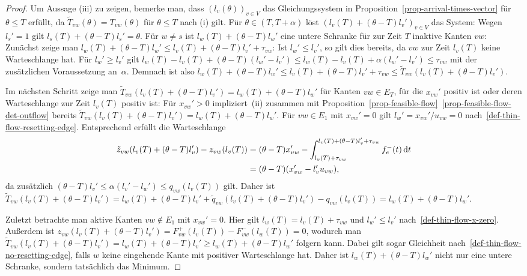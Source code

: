 \begin{proof}
	Um Aussage (iii) zu zeigen, bemerke man, dass $(l_v(\theta))_{v\in V}$ das Gleichungssystem in Proposition~\ref{prop-arrival-times-vector} für $\theta \leq T$ erfüllt, da $\tilde{T}_{vw}(\theta) = T_{vw}(\theta)$ für $\theta\leq T$ nach (i) gilt.
	Für $\theta \in (T, T+\alpha)$ löst $(l_v(T) + (\theta - T)l_v')_{v\in V}$  das System:
	Wegen $l_s' = 1$ gilt $l_s(T) + (\theta - T)l_s' = \theta$.
	Für $w\neq s$ ist $l_w(T) + (\theta - T) l_w'$ eine untere Schranke für zur Zeit $T$ inaktive Kanten $vw$:
	Zunächst zeige man $l_w(T) + (\theta - T)l_w' \leq l_v(T) + (\theta - T)l_v' + \tau_{vw}$:
	Ist $l_w' \leq l_v'$, so gilt dies bereits, da $vw$ zur Zeit $l_v(T)$ keine Warteschlange hat.
	Für $l_w' \geq l_v'$ gilt $l_w(T) - l_v(T) + (\theta - T) (l_w' - l_v') \leq l_w(T) - l_v(T) + \alpha (l_w' - l_v') \leq \tau_{vw}$ mit der zusätzlichen Voraussetzung an~$\alpha$.
	Demnach ist also $l_w(T) + (\theta - T) l_w' \leq l_v(T) + (\theta - T) l_v' + \tau_{vw} \leq \tilde{T}_{vw}(l_v(T) + (\theta - T) l_v')$.
	
	Im nächsten Schritt zeige man $\tilde{T}_{vw}(l_v(T) + (\theta - T)l_v') = l_w(T) + (\theta - T) l_w'$ für Kanten $vw\in E_T$, für die $x_{vw}'$ positiv ist oder deren Warteschlange zur Zeit $l_v(T)$ positiv ist:
	Für $x_{vw}' > 0$ impliziert~(ii) zusammen mit Proposition~\ref{prop-feasible-flow}~\ref{prop-feasible-flow-det-outflow} bereits $\tilde{T}_{vw}(l_v(T) + (\theta-T)l_v') = l_w(T) + (\theta - T) l_w'$.
	Für $vw\in E_1$ mit $x_{vw}'=0$ gilt $l_w' = x_{vw}' / u_{vw} = 0$ nach~\ref{def-thin-flow-resetting-edge}.
	Entsprechend erfüllt die Warteschlange
	\begin{align*}
	\tilde{z}_{vw}(l_v(T) + (\theta - T)l_v') - z_{vw}(l_v(T)) &= (\theta - T) x_{vw}' - \int_{l_v(T) + \tau_{vw}}^{l_v(T) + (\theta - T) l_v' + \tau_{vw}} f_e^-(t) \mathop{}\!\mathrm{d} t \\
	&= (\theta - T) (x_{vw}' -l_v' u_{vw}),
	\end{align*}
	da zusätzlich $(\theta-T) l_v' \leq \alpha (l_v' - l_w') \leq q_{vw}(l_v(T))$ gilt.
	Daher ist $\tilde{T}_{vw}(l_v(T) + (\theta - T)l_v') = l_w(T) + (\theta - T) l_v'  + \tilde{q}_{vw}(l_v(T) + (\theta - T)l_v')- q_{vw}(l_v(T)) = l_w(T) + (\theta - T) l_w'$.
	
	Zuletzt betrachte man aktive Kanten $vw\notin E_1$ mit $x_{vw}' = 0$.
	Hier gilt $l_w(T) = l_v(T) + \tau_{vw}$ und $l_w' \leq l_v'$ nach~\ref{def-thin-flow-x-zero}.
	Außerdem ist $z_{vw}(l_v(T) + (\theta - T) l_v') = F_{vw}^+(l_v(T)) - F_{vw}^-(l_w(T)) = 0$, wodurch man $\tilde{T}_{vw}(l_v(T) + (\theta - T) l_v') = l_w(T) + (\theta - T)l_v' \geq l_w(T) + (\theta - T) l_w'$ folgern kann.
	Dabei gilt sogar Gleichheit nach~\ref{def-thin-flow-no-resetting-edge}, falls $w$ keine eingehende Kante mit positiver Warteschlange hat.
	Daher ist $l_w(T)+(\theta - T) l_w'$ nicht nur eine untere Schranke, sondern tatsächlich das Minimum.
	

\end{proof}
